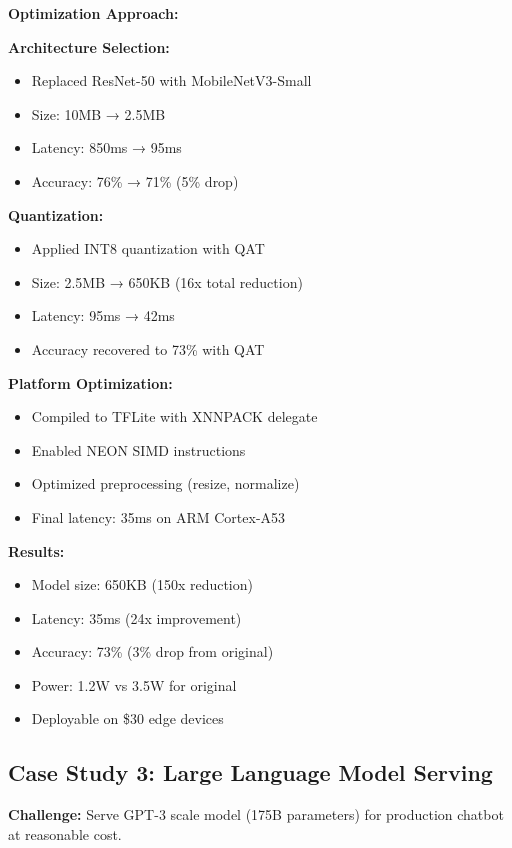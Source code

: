 \textbf{Optimization Approach:}

\textbf{Architecture Selection:}
\begin{itemize}
    \item Replaced ResNet-50 with MobileNetV3-Small
    \item Size: 10MB → 2.5MB
    \item Latency: 850ms → 95ms
    \item Accuracy: 76\% → 71\% (5\% drop)
\end{itemize}

\textbf{Quantization:}
\begin{itemize}
    \item Applied INT8 quantization with QAT
    \item Size: 2.5MB → 650KB (16x total reduction)
    \item Latency: 95ms → 42ms
    \item Accuracy recovered to 73\% with QAT
\end{itemize}

\textbf{Platform Optimization:}
\begin{itemize}
    \item Compiled to TFLite with XNNPACK delegate
    \item Enabled NEON SIMD instructions
    \item Optimized preprocessing (resize, normalize)
    \item Final latency: 35ms on ARM Cortex-A53
\end{itemize}

\textbf{Results:}
\begin{itemize}
    \item Model size: 650KB (150x reduction)
    \item Latency: 35ms (24x improvement)
    \item Accuracy: 73\% (3\% drop from original)
    \item Power: 1.2W vs 3.5W for original
    \item Deployable on \$30 edge devices
\end{itemize}

\subsection{Case Study 3: Large Language Model Serving}

\textbf{Challenge:} Serve GPT-3 scale model (175B parameters) for production chatbot at reasonable cost.


